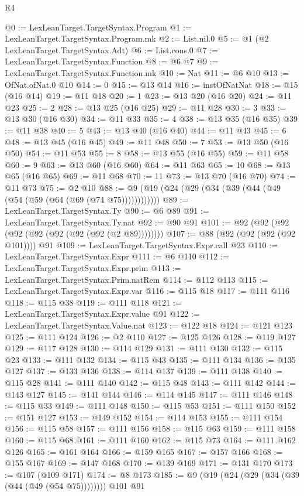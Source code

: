 \begin{lexlean}{R4}
\begin{coremodule}
@0 := LexLeanTarget.TargetSyntax.Program
@1 := LexLeanTarget.TargetSyntax.Program.mk
@2 := List.nil.{0}
@5 := @1 (@2 LexLeanTarget.TargetSyntax.Adt)
@6 := List.cons.{0}
@7 := LexLeanTarget.TargetSyntax.Function
@8 := @6 @7
@9 := LexLeanTarget.TargetSyntax.Function.mk
@10 := Nat
@11 := @6 @10
@13 := OfNat.ofNat.{0} @10
@14 := 0
@15 := @13 @14
@16 := instOfNatNat
@18 := @15 (@16 @14)
@19 := @11 @18
@20 := 1
@23 := @13 @20 (@16 @20)
@24 := @11 @23
@25 := 2
@28 := @13 @25 (@16 @25)
@29 := @11 @28
@30 := 3
@33 := @13 @30 (@16 @30)
@34 := @11 @33
@35 := 4
@38 := @13 @35 (@16 @35)
@39 := @11 @38
@40 := 5
@43 := @13 @40 (@16 @40)
@44 := @11 @43
@45 := 6
@48 := @13 @45 (@16 @45)
@49 := @11 @48
@50 := 7
@53 := @13 @50 (@16 @50)
@54 := @11 @53
@55 := 8
@58 := @13 @55 (@16 @55)
@59 := @11 @58
@60 := 9
@63 := @13 @60 (@16 @60)
@64 := @11 @63
@65 := 10
@68 := @13 @65 (@16 @65)
@69 := @11 @68
@70 := 11
@73 := @13 @70 (@16 @70)
@74 := @11 @73
@75 := @2 @10
@88 := @9 (@19 (@24 (@29 (@34 (@39 (@44 (@49 (@54 (@59 (@64 (@69 (@74 @75))))))))))))
@89 := LexLeanTarget.TargetSyntax.Ty
@90 := @6 @89
@91 := LexLeanTarget.TargetSyntax.Ty.nat
@92 := @90 @91
@101 := @92 (@92 (@92 (@92 (@92 (@92 (@92 (@92 (@2 @89))))))))
@107 := @88 (@92 (@92 (@92 (@92 @101)))) @91
@109 := LexLeanTarget.TargetSyntax.Expr.call @23
@110 := LexLeanTarget.TargetSyntax.Expr
@111 := @6 @110
@112 := LexLeanTarget.TargetSyntax.Expr.prim
@113 := LexLeanTarget.TargetSyntax.Prim.natRem
@114 := @112 @113
@115 := LexLeanTarget.TargetSyntax.Expr.var
@116 := @115 @18
@117 := @111 @116
@118 := @115 @38
@119 := @111 @118
@121 := LexLeanTarget.TargetSyntax.Expr.value @91
@122 := LexLeanTarget.TargetSyntax.Value.nat
@123 := @122 @18
@124 := @121 @123
@125 := @111 @124
@126 := @2 @110
@127 := @125 @126
@128 := @119 @127
@129 := @117 @128
@130 := @114 @129
@131 := @111 @130
@132 := @115 @23
@133 := @111 @132
@134 := @115 @43
@135 := @111 @134
@136 := @135 @127
@137 := @133 @136
@138 := @114 @137
@139 := @111 @138
@140 := @115 @28
@141 := @111 @140
@142 := @115 @48
@143 := @111 @142
@144 := @143 @127
@145 := @141 @144
@146 := @114 @145
@147 := @111 @146
@148 := @115 @33
@149 := @111 @148
@150 := @115 @53
@151 := @111 @150
@152 := @151 @127
@153 := @149 @152
@154 := @114 @153
@155 := @111 @154
@156 := @115 @58
@157 := @111 @156
@158 := @115 @63
@159 := @111 @158
@160 := @115 @68
@161 := @111 @160
@162 := @115 @73
@164 := @111 @162 @126
@165 := @161 @164
@166 := @159 @165
@167 := @157 @166
@168 := @155 @167
@169 := @147 @168
@170 := @139 @169
@171 := @131 @170
@173 := @107 (@109 @171)
@174 := @8 @173
@185 := @9 (@19 (@24 (@29 (@34 (@39 (@44 (@49 (@54 @75)))))))) @101 @91

\end{coremodule}
\end{lexlean}
